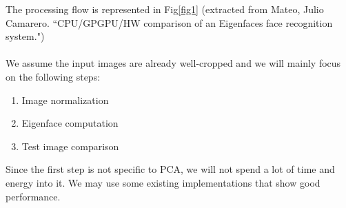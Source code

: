\documentclass[12pt]{article}
\begin{document}
The processing flow is represented in Fig\ref{fig1} (extracted from Mateo, Julio Camarero. ``CPU/GPGPU/HW comparison of an Eigenfaces face recognition system.")\\\\
We assume the input images are already well-cropped and we will mainly focus on the following steps:
\begin{enumerate}
\item Image normalization
\item Eigenface computation
\item Test image comparison
\end{enumerate}
Since the first step is not specific to PCA, we will not spend a lot of time and energy into it. We may use some existing implementations that show good performance.
\end{document}
